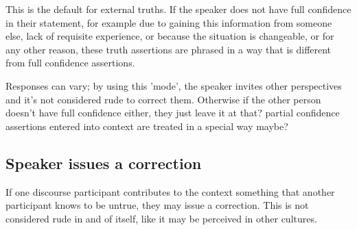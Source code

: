 \documentclass[smallroyalvopaper,9pt]{memoir} %
\begin{document}
This is the default for external truths.
If the speaker does not have full confidence in their statement, for example due to gaining this information from someone else, lack of requisite experience, or because the situation is changeable, or for any other reason, these truth assertions are phrased in a way that is different from full confidence assertions. 

Responses can vary; by using this 'mode', the speaker invites other perspectives and it's not considered rude to correct them. Otherwise if the other person doesn't have full confidence either, they just leave it at that? partial confidence assertions entered into context are treated in a special way maybe?

\subsection{Speaker issues a correction}

If one discourse participant contributes to the context something that another participant knows to be untrue, they may issue a correction. This is not considered rude in and of itself, like it may be perceived in other cultures. 

%

\end{document}
